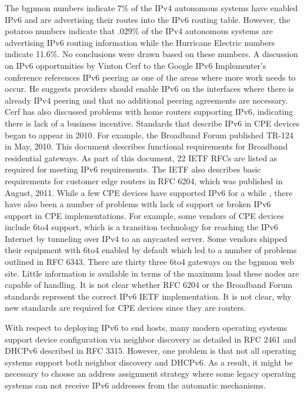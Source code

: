 The bgpmon numbers indicate 7\% of the IPv4 autonomous systems have
enabled IPv6 and are advertising their routes into the IPv6 routing
table.  However, the potaroo numbers indicate that .029\% of the IPv4
autonomous systems are advertising IPv6 routing information while
the Hurricane Electric numbers indicate 11.6\%.  No conclusions were
drawn based on these numbers.  A discussion on IPv6 opportunities by
Vinton Cerf to the Google IPv6 Implementer's conference references 
IPv6 peering as one of the areas where more
work needs to occur.  He suggests providers should
enable IPv6 on the interfaces where there is already IPv4 peering
and that no additional peering agreements are necessary.  Cerf has
also discussed problems with home routers supporting IPv6, indicating
there is lack of a business incentive.  Standards that describe IPv6
in CPE devices began to appear in 2010\cite{Cpe02,Broadband01}.
For example, the Broadband Forum published TR-124 in May, 2010.
This document describes functional requirements for Broadband
residential gateways.  As part of this document, 22 IETF RFCs are
listed as required for meeting IPv6 requirements\cite{Broadband01}.
The IETF also describes basic requirements for customer edge routers
in RFC 6204, which was published in August, 2011.
While a few CPE devices have supported IPv6 for a while \cite{Cpe01},
there have also been a number of problems with lack of support
or broken IPv6 support in CPE implementations\cite{Cpe01,Cpe02}.
For example, some vendors of CPE devices include 6to4 support,
which is a transition technology for reaching the IPv6 Internet by
tunneling over IPv4 to an anycasted server.  Some vendors shipped
their equipment with 6to4 enabled by default which led to a number
of problems outlined in RFC 6343.  There are thirty three 6to4
gateways on the bgpmon web site.  Little information
is available in terms of the maximum load these nodes are capable
of handling.  It is not clear whether RFC 6204 or the Broadband
Forum standards represent the correct IPv6 IETF implementation.
It is not clear, why new standards are
required for CPE devices since they are routers.

With respect to deploying IPv6 to end hosts, many modern
operating systems support device configuration via neighbor
discovery as detailed in RFC 2461 and DHCPv6 described in RFC
3315.  However, one problem is that not all operating systems 
support both neighbor discovery and DHCPv6.  
As a result, it might be
necessary to choose an address assignment strategy where some
legacy operating systems can not receive IPv6 addresses from the
automatic mechanisms.


